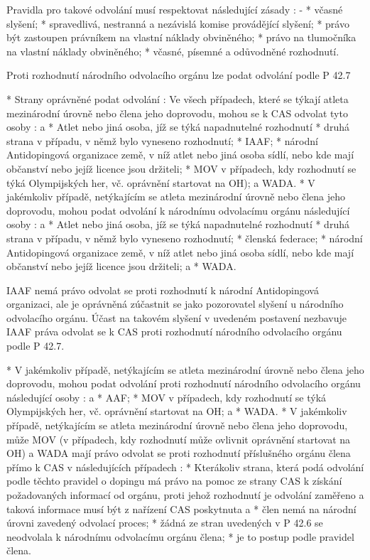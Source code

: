 Pravidla pro takové odvolání musí respektovat následující zásady :
  \begitems \style -
  * včasné slyšení;
  * spravedlivá, nestranná a nezávislá komise provádějící slyšení;
  * právo být zastoupen právníkem na vlastní náklady obviněného;
  * právo na tlumočníka na vlastní náklady obviněného;
  * včasné, písemné a odůvodněné rozhodnutí.
  \enditems

Proti rozhodnutí národního odvolacího orgánu lze podat odvolání podle P 42.7

* Strany oprávněné podat odvolání : Ve všech případech, které se týkají atleta mezinárodní úrovně nebo člena jeho doprovodu, mohou se k CAS odvolat tyto osoby :
  \begitems \style a
  * Atlet nebo jiná osoba, jíž se týká napadnutelné rozhodnutí
  * druhá strana v případu, v němž bylo vyneseno rozhodnutí;
  * IAAF;
  * národní Antidopingová organizace země, v níž atlet nebo jiná osoba sídlí, nebo kde mají občanství nebo jejíž licence jsou držiteli;
  * MOV v případech, kdy rozhodnutí se týká Olympijských her, vč. oprávnění startovat na OH); a WADA.
  \enditems
* V jakémkoliv případě, netýkajícím se atleta mezinárodní úrovně nebo člena jeho doprovodu, mohou podat odvolání k národnímu odvolacímu orgánu následující osoby :
  \begitems \style a
  * Atlet nebo jiná osoba, jíž se týká napadnutelné rozhodnutí
  * druhá strana v případu, v němž bylo vyneseno rozhodnutí;
  * členská federace;
  * národní Antidopingová organizace země, v níž atlet nebo jiná osoba sídlí, nebo kde mají občanství nebo jejíž licence jsou držiteli; a
  * WADA.
  \enditems

IAAF nemá právo odvolat se proti rozhodnutí k národní Antidopingová organizaci, ale je oprávněná zúčastnit se jako pozorovatel slyšení u národního odvolacího orgánu. Účast na takovém slyšení v uvedeném postavení nezbavuje IAAF práva odvolat se k CAS proti rozhodnutí národního odvolacího orgánu podle P 42.7.

* V jakémkoliv případě, netýkajícím se atleta mezinárodní úrovně nebo člena jeho doprovodu, mohou podat odvolání proti rozhodnutí národního odvolacího orgánu následující osoby :
  \begitems \style a
  * AAF;
  * MOV v případech, kdy rozhodnutí se týká Olympijských her, vč. oprávnění startovat na OH; a
  * WADA.
  \enditems
* V jakémkoliv případě, netýkajícím se atleta mezinárodní úrovně nebo člena jeho doprovodu, může MOV (v případech, kdy rozhodnutí může ovlivnit oprávnění startovat na OH) a WADA mají právo odvolat se proti rozhodnutí příslušného orgánu člena přímo k CAS v následujících případech :
* Kterákoliv strana, která podá odvolání podle těchto pravidel o dopingu má právo na pomoc  ze strany CAS k získání požadovaných informací od orgánu, proti jehož rozhodnutí je odvolání zaměřeno a taková informace musí být z nařízení CAS poskytnuta
  \begitems \style a
  * člen nemá na národní úrovni zavedený odvolací proces;
  * žádná ze stran uvedených v P 42.6 se neodvolala k národnímu odvolacímu orgánu člena;
  * je to postup podle pravidel člena.
  \enditems

